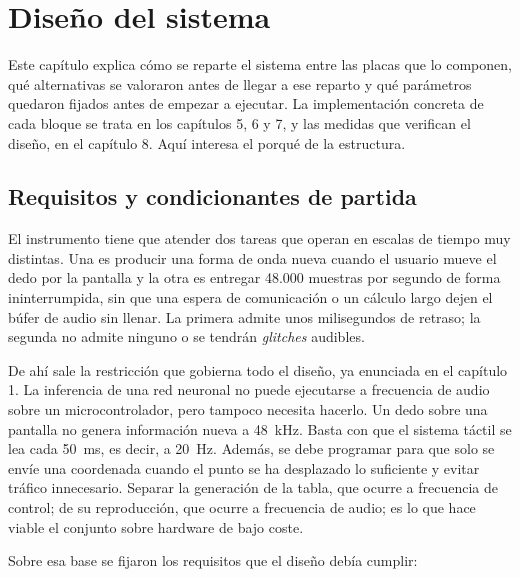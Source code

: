 \chapter{Diseño del sistema}
\label{cap:diseno}

Este capítulo explica cómo se reparte el sistema entre las placas que lo
componen, qué alternativas se valoraron antes de llegar a ese reparto y qué
parámetros quedaron fijados antes de empezar a ejecutar. La
implementación concreta de cada bloque se trata en los capítulos 5, 6 y 7, y las
medidas que verifican el diseño, en el capítulo 8. Aquí interesa el porqué de la
estructura.

\section{Requisitos y condicionantes de partida}
\label{sec:requisitos}
\hypertarget{RE1.2b}{}\label{RE1.2b}

El instrumento tiene que atender dos tareas que operan en escalas de tiempo muy
distintas. Una es producir una forma de onda nueva cuando el usuario mueve el
dedo por la pantalla y la otra es entregar 48.000 muestras por segundo de forma
ininterrumpida, sin que una espera de comunicación o un cálculo largo dejen el
búfer de audio sin llenar. La primera admite unos milisegundos de retraso; la
segunda no admite ninguno o se tendrán \emph{glitches} audibles.

De ahí sale la restricción que gobierna todo el diseño, ya enunciada en el capítulo 1. La inferencia de una red neuronal no puede ejecutarse a
frecuencia de audio sobre un microcontrolador, pero tampoco necesita hacerlo.
Un dedo sobre una pantalla no genera información nueva a 48~kHz. Basta con que el
sistema táctil se lea cada 50~ms, es decir, a 20~Hz. Además, se debe programar para que
solo se envíe una coordenada cuando el punto se ha desplazado lo suficiente y evitar tráfico innecesario. 
Separar la generación de la tabla, que ocurre a frecuencia de control; de su reproducción, que ocurre
a frecuencia de audio; es lo que hace viable el conjunto sobre hardware de bajo coste.

Sobre esa base se fijaron los requisitos que el diseño debía cumplir:

